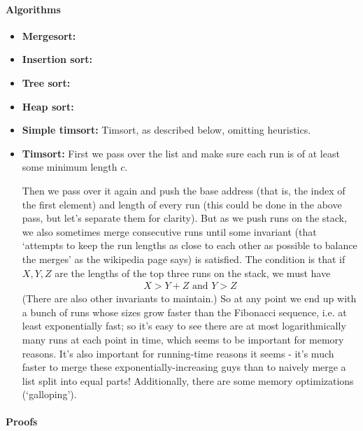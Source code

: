 \documentclass{article}
\begin{document}
\paragraph{Algorithms}
\begin{itemize}
  \item \textbf{Mergesort:}
  \item \textbf{Insertion sort:}
  \item \textbf{Tree sort:}
  \item \textbf{Heap sort:}
  \item \textbf{Simple timsort:}
    Timsort, as described below, omitting heuristics.
  \item \textbf{Timsort:}
	  First we pass over the list and make sure each run is of at
    least some minimum length $c$.

    Then we pass over it again and push the base address (that is, the index of
    the first element) and length of every run (this could be done in the above
    pass, but let's separate them for clarity).
    But as we push runs on the stack,
    we also sometimes merge consecutive runs until some invariant
    (that `attempts
    to keep the run lengths as close to each other as possible to balance the
    merges' as the wikipedia page says) is satisfied.
    The condition is that if
    $X,Y,Z$ are the lengths of the top three runs on the stack, we must have
	  \begin{align*}
	  X > Y + Z \text{ and } Y >Z
    \end{align*}
    (There are also other invariants to maintain.)
	  So at any point we end up with a bunch of runs whose sizes grow
    faster than the Fibonacci sequence, i.e. at least exponentially fast; so
    it's easy to see there are at most logarithmically
    many runs at each point in
    time, which seems to be important for memory reasons.
    It's also important for
    running-time reasons it seems - it's much faster to merge these
    exponentially-increasing guys than to naively merge a list split into
    equal parts!
	  Additionally, there are some memory optimizations (`galloping').
\end{itemize}

\paragraph{Proofs}  %
\end{document}
